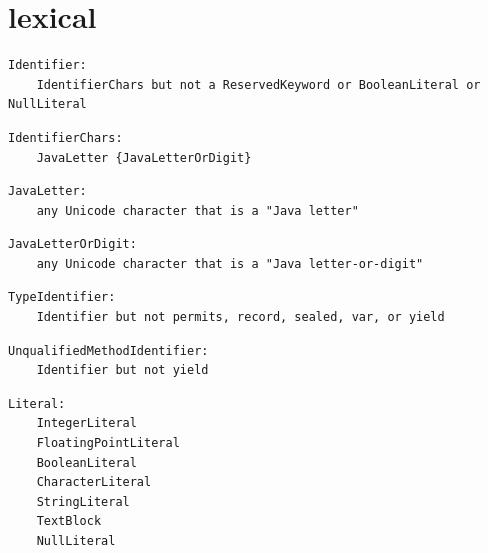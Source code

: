 
\section{lexical}

\noindent\textbf{\texttt{}}\par
\begin{lstlisting}
Identifier:
    IdentifierChars but not a ReservedKeyword or BooleanLiteral or NullLiteral
\end{lstlisting}

\noindent\textbf{\texttt{}}\par
\begin{lstlisting}
IdentifierChars:
    JavaLetter {JavaLetterOrDigit}
\end{lstlisting}

\noindent\textbf{\texttt{}}\par
\begin{lstlisting}
JavaLetter:
    any Unicode character that is a "Java letter"
\end{lstlisting}

\noindent\textbf{\texttt{}}\par
\begin{lstlisting}
JavaLetterOrDigit:
    any Unicode character that is a "Java letter-or-digit"
\end{lstlisting}

\noindent\textbf{\texttt{}}\par
\begin{lstlisting}
TypeIdentifier:
    Identifier but not permits, record, sealed, var, or yield
\end{lstlisting}

\noindent\textbf{\texttt{}}\par
\begin{lstlisting}
UnqualifiedMethodIdentifier:
    Identifier but not yield
\end{lstlisting}

\noindent\textbf{\texttt{}}\par
\begin{lstlisting}
Literal:
    IntegerLiteral
    FloatingPointLiteral
    BooleanLiteral
    CharacterLiteral
    StringLiteral
    TextBlock
    NullLiteral
\end{lstlisting}

